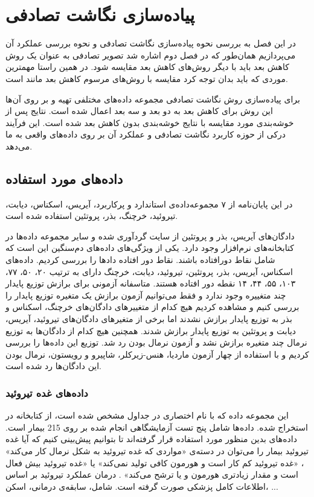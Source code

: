 \chapter{
پیاده‌سازی نگاشت تصادفی
}

در این فصل به بررسی نحوه پیاده‌سازی نگاشت تصادفی و نحوه بررسی عملکرد آن می‌پردازیم همان‌طور که در فصل دوم 
اشاره شد تصویر تصادفی به عنوان یک روش کاهش بعد باید با دیگر روش‌های کاهش بعد مقایسه شود. در همین راستا مهمترین موردی که باید بدان توجه کرد مقایسه با روش‌های مرسوم کاهش بعد مانند
است.

برای پیاده‌سازی روش نگاشت تصادفی مجموعه داده‌های مختلفی تهیه‌ و بر روی آن‌ها این روش برای کاهش بعد به دو بعد و سه بعد اعمال شده است. نتایج پس از خوشه‌بندی مورد مقایسه با نتایج خوشه‌بندی بدون کاهش بعد شده است. این فرآیند درکی از حوزه کاربرد نگاشت تصادفی و عملکرد آن بر روی داده‌های واقعی به ما می‌دهد.


\section{
داده‌‌های مورد استفاده
}

در این پایان‌نامه از ۷ مجموعه‌داده‌ی استاندارد و پرکاربرد، آیریس، اسکناس، دیابت، تیروئید، خرچنگ، بذر، پروتئین استفاده شده است.

دادگا‌ن‌های آیریس، بذر و پروتئین از سایت 
گردآوری شده و سایر مجموعه داده‌ها در کتابخانه‌های نرم‌افزار 
وجود دارد. یکی از ویژگی‌های داده‌های دم‌سنگین این است که شامل نقاط دورافتاده باشند. نقاط دور افتاده داد‌ها را بررسی کردیم. داده‌های اسکناس، آیریس، بذر، پروتئین، تیروئید، دیابت، خرچنگ دارای به ترتیب ۲۰، ۵۰، ۷۷، ۱۰۳، ۵۵، ۴۴، ۱۴ نقطه دور افتاده هستند. متاسفانه آزمونی برای برازش توزیع پایدار چند متغییره وجود ندارد و فقط می‌توانیم آزمون برازش یک متغیره توزیع پایدار را بررسی کنیم و مشاهده کردیم هیچ کدام از متغییر‌های دادگان‌های خرچنگ، اسکناس و بذر به توزیع پایدار برازش نشدند اما برخی از متغیرهای دادگان‌های تیروئید، آیریس، دیابت و پروتئین به توزیع پایدار برازش شدند. همچنین هیچ کدام از دادگان‌ها به توزیع نرمال چند متغیره برازش نشد و آزمون نرمال بودن رد شد. توزیع این داده‌ها را بررسی کردیم و با استفاده از چهار آزمون ماردیا، هنس-زیرکلر، شاپیرو و رویستون، نرمال بودن این دادگان‌ها رد شده است.

\subsection{
داده‌های غده تیروئید
}

این مجموعه داده که با نام اختصاری 
در جداول مشخص شده است، از کتابخانه
\cite{rmclust}
در 
استخراج شده. داده‌ها شامل پنج تست آزمایشگاهی انجام شده بر روی 215 بیمار است. داده‌های بدین منظور مورد استفاده قرار گرفته‌اند تا بتوانیم پیش‌بینی کنیم که آیا غده تیروئید بیمار را می‌توان در دسته‌ی «مواردی که غده تیروئید به شکل نرمال کار می‌کند»
، «غده تیروئید کم کار است و هورمون کافی تولید نمی‌کند»
یا «غده تیروئید بیش فعال است و مقدار زیادتری هورمون 
و یا
ترشح می‌کند»
. درمان عملکرد تیروئید بر اساس اطلاعات کامل پزشکی صورت گرفته است. شامل، سابقه‌ی درمانی، اسکن، ...

